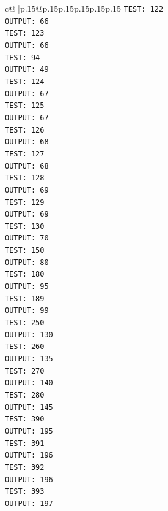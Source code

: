 \documentclass{article}
\begin{document}
{\begin{supertabular}{c@{$\;$}|p{.15\linewidth}@{}p{.15\linewidth}p{.15\linewidth}p{.15\linewidth}p{.15\linewidth}p{.15\linewidth}}
{{{\texttt{TEST: 122} \\
\texttt{OUTPUT: 66} \\
\texttt{TEST: 123} \\
\texttt{OUTPUT: 66} \\
\texttt{TEST: 94} \\
\texttt{OUTPUT: 49} \\
\texttt{TEST: 124} \\
\texttt{OUTPUT: 67} \\
\texttt{TEST: 125} \\
\texttt{OUTPUT: 67} \\
\texttt{TEST: 126} \\
\texttt{OUTPUT: 68} \\
\texttt{TEST: 127} \\
\texttt{OUTPUT: 68} \\
\texttt{TEST: 128} \\
\texttt{OUTPUT: 69} \\
\texttt{TEST: 129} \\
\texttt{OUTPUT: 69} \\
\texttt{TEST: 130} \\
\texttt{OUTPUT: 70} \\
\texttt{TEST: 150} \\
\texttt{OUTPUT: 80} \\
\texttt{TEST: 180} \\
\texttt{OUTPUT: 95} \\
\texttt{TEST: 189} \\
\texttt{OUTPUT: 99} \\
\texttt{TEST: 250} \\
\texttt{OUTPUT: 130} \\
\texttt{TEST: 260} \\
\texttt{OUTPUT: 135} \\
\texttt{TEST: 270} \\
\texttt{OUTPUT: 140} \\
\texttt{TEST: 280} \\
\texttt{OUTPUT: 145} \\
\texttt{TEST: 390} \\
\texttt{OUTPUT: 195} \\
\texttt{TEST: 391} \\
\texttt{OUTPUT: 196} \\
\texttt{TEST: 392} \\
\texttt{OUTPUT: 196} \\
\texttt{TEST: 393} \\
\texttt{OUTPUT: 197} \\
}}}
\end{supertabular}}
\end{document}
